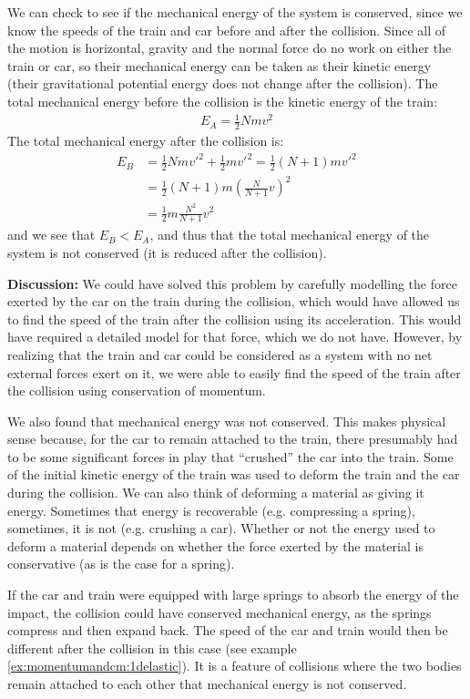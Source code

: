 \begin{example}
We can check to see if the mechanical energy of the system is conserved, since we know the speeds of the train and car before and after the collision. Since all of the motion is horizontal, gravity and the normal force do no work on either the train or car, so their mechanical energy can be taken as their kinetic energy (their gravitational potential energy does not change after the collision). The total mechanical energy before the collision is the kinetic energy of the train:
\begin{align*}
E_A = \frac{1}{2}Nmv^2
\end{align*}
The total mechanical energy after the collision is:
\begin{align*}
E_B &= \frac{1}{2}Nmv'^2 + \frac{1}{2}mv'^2 = \frac{1}{2}(N+1)mv'^2 \\
&=\frac{1}{2}(N+1)m \left( \frac{N}{N+1}v \right)^2\\
&=\frac{1}{2}m\frac{N^2}{N+1}v^2
\end{align*}
and we see that $E_B<E_A$, and thus that the total mechanical energy of the system is not conserved (it is reduced after the collision).

\textbf{Discussion: }We could have solved this problem by carefully modelling the force exerted by the car on the train during the collision, which would have allowed us to find the speed of the train after the collision using its acceleration. This would have required a detailed model for that force, which we do not have. However, by realizing that the train and car could be considered as a system with no net external forces exert on it, we were able to easily find the speed of the train after the collision using conservation of momentum.

We also found that mechanical energy was not conserved. This makes physical sense because, for the car to remain attached to the train, there presumably had to be some significant forces in play that ``crushed'' the car into the train. Some of the initial kinetic energy of the train was used to deform the train and the car during the collision. We can also think of deforming a material as giving it energy. Sometimes that energy is recoverable (e.g. compressing a spring), sometimes, it is not (e.g. crushing a car). Whether or not the energy used to deform a material depends on whether the force exerted by the material is conservative (as is the case for a spring).

If the car and train were equipped with large springs to absorb the energy of the impact, the collision could have conserved mechanical energy, as the springs compress and then expand back. The speed of the car and train would then be different after the collision in this case (see example \ref{ex:momentumandcm:1delastic}). It is a feature of collisions where the two bodies remain attached to each other that mechanical energy is not conserved.
\end{example}


